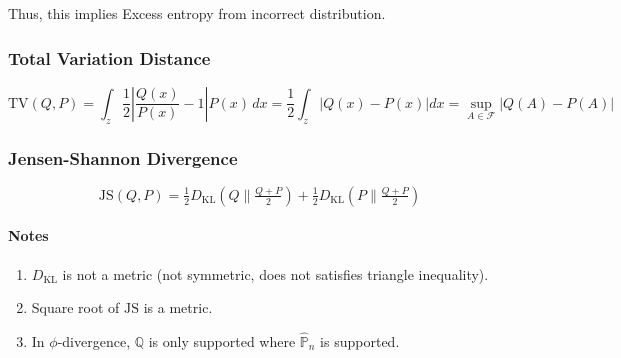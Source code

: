 \documentclass[11pt]{report}
\begin{document}
Thus, this implies Excess entropy from incorrect distribution.

\subsubsection*{Total Variation Distance}
\[
\mathrm{TV}(Q,P) = \int_{z} \frac{1}{2} \left| \frac{Q(x)}{P(x)} - 1 \right| P(x)\, dx 
= \frac{1}{2} \int_{z} |Q(x) - P(x)| dx 
= \sup_{A \in \mathcal{F}} |Q(A) - P(A)|
\]

\subsubsection*{Jensen-Shannon Divergence}
\[
\mathrm{JS}(Q,P) = \tfrac{1}{2} D_{\mathrm{KL}}\!\left(Q \Big\| \tfrac{Q+P}{2}\right) 
+ \tfrac{1}{2} D_{\mathrm{KL}}\!\left(P \Big\| \tfrac{Q+P}{2}\right)
\]

\paragraph{Notes}
\begin{enumerate}
    \item $D_{\mathrm{KL}}$ is not a metric (not symmetric, does not satisfies triangle inequality).
    \item Square root of $\mathrm{JS}$ is a metric.
    \item In $\phi$-divergence, $\mathbb{Q}$ is only supported where $\hat{\mathbb{P}}_n$ is supported.
\end{enumerate}
\end{document}
